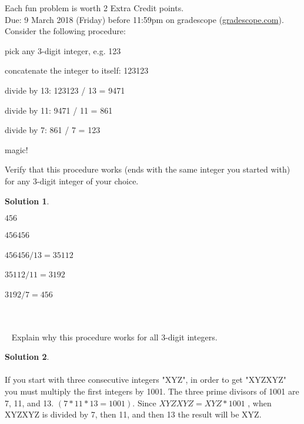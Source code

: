 \documentclass{article}
\theoremstyle{definition}
\newtheorem*{solution}{Solution}
\begin{document}
\noindent
Each fun problem is worth 2 Extra Credit points.\\
Due: 9 March 2018 (Friday) before 11:59pm on gradescope (\url{gradescope.com}).\\

\noindent
Consider the following procedure:
\begin{compactenum}
\item pick any 3-digit integer, e.g. 123
\item concatenate the integer to itself: 123123
\item divide by 13: 123123 / 13 = 9471
\item divide by 11: 9471 / 11 = 861
\item divide by 7: 861 / 7 = 123
\item magic!
\end{compactenum}

\vspace{12pt}

\noindent
Verify that this procedure works (ends with the same integer you started with) for any 3-digit integer of your choice.

\begin{solution}\ \\
\begin{compactenum}
\item $456$
\item $456456$\
\item $456456 / 13 = 35112$\
\item $35112/ 11 = 3192$\
\item $3192/ 7 = 456$\
\end{compactenum}
\end{solution}

\ \\ \\ \
\noindent
Explain why this procedure works for all 3-digit integers.

\begin{solution}\ \\ \ \\
If you start with three consecutive integers "XYZ", in order to get "XYZXYZ" you must multiply the first integers by 1001. The three prime divisors of 1001 are 7, 11, and 13.
$(7*11*13 = 1001)$. Since $XYZXYZ = XYZ*1001$ , when XYZXYZ is divided by 7, then 11, and then 13 the result will be XYZ.

\end{solution}

\vfill
\end{document}
